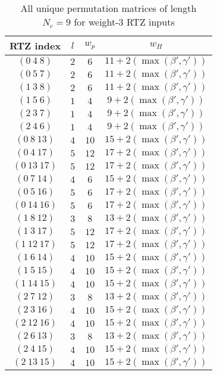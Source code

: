 \documentclass[11pt, oneside, dvipdfmx]{book}
\begin{document}
\begin{table}
\centering
\begin{tabular}{||c |c  |c  |c |} 
 \hline
 RTZ index  & $ l$ & $w_p$& $w_H$\\
 \hline
 $(0~4~8)$ & $2$ & $6$ & $11+2(\max{(\beta',\gamma')})$\\
 \hline
 $(0~5~7)$ &  $2$ & $6$ &$11+2(\max{(\beta',\gamma')})$\\
 \hline
 $(1~3~8) $ &  $2$ & $6$ & $11+2(\max{(\beta',\gamma')})$\\
 \hline
 $(1~5~6) $ &  $1$ & $4$ & $9+2(\max{(\beta',\gamma')})$\\
 \hline
 $(2~3~7)$ & $1$ & $4$ & $9+2(\max{(\beta',\gamma')})$\\
 \hline
 $(2~4~6)$ & $1$ & $4$ & $9+2(\max{(\beta',\gamma')})$\\
 \hline\hline
  $(0~8~13)$ & $4$ & $10$ & $15+2(\max{(\beta',\gamma')})$\\
 \hline
 $(0~4~17)$ & $5$ & $12$ & $17+2(\max{(\beta',\gamma')})$\\
 \hline
 $(0~13~17)$ & $5$ & $12$ & $17+2(\max{(\beta',\gamma')})$\\
 \hline
  $(0~7~14)$ &  $4$ & $6$ &$15+2(\max{(\beta',\gamma')})$\\
 \hline
  $(0~5~16)$ &  $5$ & $6$ &$17+2(\max{(\beta',\gamma')})$\\
 \hline
  $(0~14~16)$ &  $5$ & $6$ &$17+2(\max{(\beta',\gamma')})$\\
 \hline
 $(1~8~12) $ &  $3$ & $8$ & $13+2(\max{(\beta',\gamma')})$\\
 \hline
 $(1~3~17) $ &  $5$ & $12$ & $17+2(\max{(\beta',\gamma')})$\\
 \hline
 $(1~12~17) $ & $5$ & $12$ & $17+2(\max{(\beta',\gamma')})$\\
 \hline
  $(1~6~14) $ &  $4$ & $10$ & $15+2(\max{(\beta',\gamma')})$\\
 \hline
  $(1~5~15)$ &  $4$ & $10$ & $15+2(\max{(\beta',\gamma')})$\\
 \hline
  $(1~14~15)$ &  $4$ & $10$ & $15+2(\max{(\beta',\gamma')})$\\
 \hline
 $(2~7~12)$ & $3$ & $8$ & $13+2(\max{(\beta',\gamma')})$\\
 \hline
 $(2~3~16)$ & $4$ & $10$ & $15+2(\max{(\beta',\gamma')})$\\
 \hline
 $(2~12~16)$ & $4$ & $10$ & $15+2(\max{(\beta',\gamma')})$\\
 \hline
  $(2~6~13)$ & $3$ & $8$ & $13+2(\max{(\beta',\gamma')})$\\
 \hline
  $(2~4~15)$ & $4$ & $10$ & $15+2(\max{(\beta',\gamma')})$\\
 \hline
  $(2~13~15)$ & $4$ & $10$ & $15+2(\max{(\beta',\gamma')})$\\
 \hline
\end{tabular}
\caption{All unique permutation matrices of length $N_c =9$ for weight-$3$ RTZ inputs}
\label{tb3}
\end{table}
\end{document}
